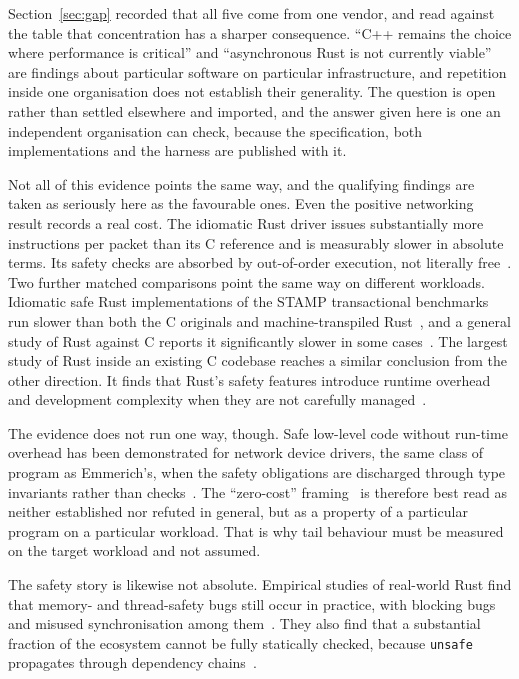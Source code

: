 \documentclass[english,oneside,a4paper,censored,csm,software-track-2020]{HYthesisML}
\begin{document}
Section~\ref{sec:gap} recorded that all five come from one vendor, and read against the table that
concentration has a sharper consequence. ``C++ remains the choice where performance is critical''
and ``asynchronous Rust is not currently viable'' are findings about particular software on
particular infrastructure, and repetition inside one organisation does not establish their
generality. The question is open rather than settled elsewhere and imported, and the answer given
here is one an independent organisation can check, because the specification, both implementations
and the harness are published with it.

Not all of this evidence points the same way, and the qualifying findings are taken as seriously
here as the favourable ones. Even the positive networking result records a real cost. The idiomatic Rust driver issues
substantially more instructions per packet than its C reference and is measurably slower in
absolute terms. Its safety checks are absorbed by out-of-order execution, not
literally free~\cite{emmerich2019drivers}. Two further matched comparisons point the same way on
different workloads. Idiomatic safe Rust implementations of the STAMP transactional benchmarks run
slower than both the C originals and machine-transpiled Rust~\cite{suchert2023stamp}, and a
general study of Rust against C reports it significantly slower in some
cases~\cite{okawa2024ruststudy}. The largest study of Rust inside an existing C codebase reaches a
similar conclusion from the other direction. It finds that Rust's safety features introduce
runtime overhead and development complexity when they are not carefully
managed~\cite{li2026rustlinux}.

The evidence does not run one way, though. Safe low-level code without run-time overhead has
been demonstrated for network device drivers, the same class of program as Emmerich's, when the
safety obligations are discharged through type invariants rather than checks~\cite{pirelli2023safelowlevel}.
The ``zero-cost'' framing~\cite{balasubramanian2017rust} is therefore best read as neither
established nor refuted in general, but as a property of a particular program on a particular
workload. That is why tail behaviour must be measured on the target workload and not assumed.

The safety story is likewise not absolute. Empirical studies of real-world Rust find that memory-
and thread-safety bugs still occur in practice, with blocking bugs and misused synchronisation
among them~\cite{qin2020rust,qin2024safety}. They also find that a substantial fraction of the
ecosystem cannot be fully statically checked, because \texttt{unsafe} propagates through
dependency chains~\cite{evans2020rust}.
\end{document}
